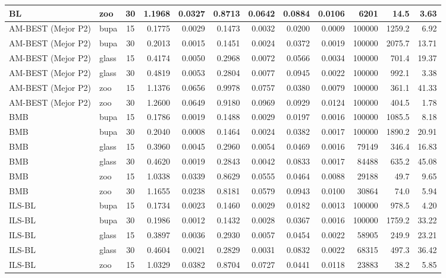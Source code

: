 \begin{longtable}{llcrrrrrrrrr}
    BL & zoo & 30 & 1.1968 & 0.0327 & 0.8713 & 0.0642 & 0.0884 & 0.0106 & 6201 & 14.5 & 3.63 \\
    \midrule
    AM-BEST (Mejor P2) & bupa & 15 & 0.1775 & 0.0029 & 0.1473 & 0.0032 & 0.0200 & 0.0009 & 100000 & 1259.2 & 6.92 \\
    AM-BEST (Mejor P2) & bupa & 30 & 0.2013 & 0.0015 & 0.1451 & 0.0024 & 0.0372 & 0.0019 & 100000 & 2075.7 & 13.71 \\
    AM-BEST (Mejor P2) & glass & 15 & 0.4174 & 0.0050 & 0.2968 & 0.0072 & 0.0566 & 0.0034 & 100000 & 701.4 & 19.37 \\
    AM-BEST (Mejor P2) & glass & 30 & 0.4819 & 0.0053 & 0.2804 & 0.0077 & 0.0945 & 0.0022 & 100000 & 992.1 & 3.38 \\
    AM-BEST (Mejor P2) & zoo & 15 & 1.1376 & 0.0656 & 0.9978 & 0.0757 & 0.0380 & 0.0079 & 100000 & 361.1 & 41.33 \\
    AM-BEST (Mejor P2) & zoo & 30 & 1.2600 & 0.0649 & 0.9180 & 0.0969 & 0.0929 & 0.0124 & 100000 & 404.5 & 1.78 \\
    \midrule
    BMB & bupa & 15 & 0.1786 & 0.0019 & 0.1488 & 0.0029 & 0.0197 & 0.0016 & 100000 & 1085.5 & 8.18 \\
    BMB & bupa & 30 & 0.2040 & 0.0008 & 0.1464 & 0.0024 & 0.0382 & 0.0017 & 100000 & 1890.2 & 20.91 \\
    BMB & glass & 15 & 0.3960 & 0.0045 & 0.2960 & 0.0054 & 0.0469 & 0.0016 & 79149 & 346.4 & 16.83 \\
    BMB & glass & 30 & 0.4620 & 0.0019 & 0.2843 & 0.0042 & 0.0833 & 0.0017 & 84488 & 635.2 & 45.08 \\
    BMB & zoo & 15 & 1.0338 & 0.0339 & 0.8629 & 0.0555 & 0.0464 & 0.0088 & 29188 & 49.7 & 9.65 \\
    BMB & zoo & 30 & 1.1655 & 0.0238 & 0.8181 & 0.0579 & 0.0943 & 0.0100 & 30864 & 74.0 & 5.94 \\
    \midrule
    ILS-BL & bupa & 15 & 0.1734 & 0.0023 & 0.1460 & 0.0029 & 0.0182 & 0.0013 & 100000 & 978.5 & 4.20 \\
    ILS-BL & bupa & 30 & 0.1986 & 0.0012 & 0.1432 & 0.0028 & 0.0367 & 0.0016 & 100000 & 1759.2 & 33.22 \\
    ILS-BL & glass & 15 & 0.3897 & 0.0036 & 0.2930 & 0.0057 & 0.0454 & 0.0022 & 58905 & 249.9 & 23.21 \\
    ILS-BL & glass & 30 & 0.4604 & 0.0021 & 0.2829 & 0.0031 & 0.0832 & 0.0022 & 68315 & 497.3 & 36.42 \\
    ILS-BL & zoo & 15 & 1.0329 & 0.0382 & 0.8704 & 0.0727 & 0.0441 & 0.0118 & 23883 & 38.2 & 5.85 \\

\end{longtable}
